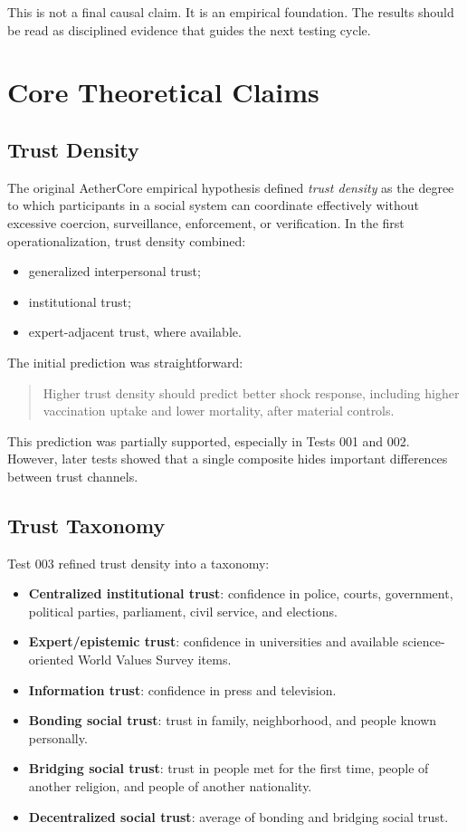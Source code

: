 \documentclass[12pt]{article}
\begin{document}
This is not a final causal claim. It is an empirical foundation. The results should be read as disciplined evidence that guides the next testing cycle.

\section{Core Theoretical Claims}

\subsection{Trust Density}

The original AetherCore empirical hypothesis defined \textit{trust density} as the degree to which participants in a social system can coordinate effectively without excessive coercion, surveillance, enforcement, or verification. In the first operationalization, trust density combined:

\begin{itemize}
  \item generalized interpersonal trust;
  \item institutional trust;
  \item expert-adjacent trust, where available.
\end{itemize}

The initial prediction was straightforward:

\begin{quote}
Higher trust density should predict better shock response, including higher vaccination uptake and lower mortality, after material controls.
\end{quote}

This prediction was partially supported, especially in Tests 001 and 002. However, later tests showed that a single composite hides important differences between trust channels.

\subsection{Trust Taxonomy}

Test 003 refined trust density into a taxonomy:

\begin{itemize}
  \item \textbf{Centralized institutional trust}: confidence in police, courts, government, political parties, parliament, civil service, and elections.
  \item \textbf{Expert/epistemic trust}: confidence in universities and available science-oriented World Values Survey items.
  \item \textbf{Information trust}: confidence in press and television.
  \item \textbf{Bonding social trust}: trust in family, neighborhood, and people known personally.
  \item \textbf{Bridging social trust}: trust in people met for the first time, people of another religion, and people of another nationality.
  \item \textbf{Decentralized social trust}: average of bonding and bridging social trust.
\end{itemize}
\end{document}
